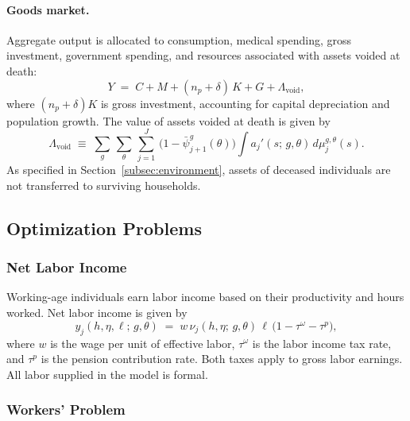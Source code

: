 \documentclass[12pt,a4paper]{article}
\begin{document}
\paragraph{Goods market.}
Aggregate output is allocated to consumption, medical spending, gross investment, government spending, and resources associated with assets voided at death:
\begin{equation}
\label{eq:goods_market}
Y \;=\; C + M + (n_p + \delta)\, K + G + \Lambda_{\mathrm{void}},
\end{equation}
where $(n_p+\delta)K$ is gross investment, accounting for capital depreciation and population growth. The value of assets voided at death is given by
\begin{equation}
\label{eq:leakage_voided}
\Lambda_{\mathrm{void}}
\;\equiv\;
\sum_g\, \sum_\theta\, \sum_{j=1}^{J}\, \bigl(1 - \bar\psi_{j+1}^{g}(\theta)\bigr)
\int a_j'(s;\, g, \theta)\, d\mu_{j}^{g,\theta}(s).
\end{equation}
As specified in Section~\ref{subsec:environment}, assets of deceased individuals are not transferred to surviving households.

\subsection{Optimization Problems}
\label{subsec:optimization}

\subsubsection{Net Labor Income}
\label{subsubsec:net_income}

Working-age individuals earn labor income based on their productivity and hours worked. Net labor income is given by
\begin{equation}
\label{eq:net_labor_income}
y_j(h, \eta, \ell;\, g, \theta) \;=\; w\, \nu_j(h, \eta;\, g, \theta)\, \ell\, \bigl(1 - \tau^\omega - \tau^p\bigr),
\end{equation}
where $w$ is the wage per unit of effective labor, $\tau^\omega$ is the labor income tax rate, and $\tau^p$ is the pension contribution rate. Both taxes apply to gross labor earnings. All labor supplied in the model is formal.


\subsubsection{Workers' Problem}
\label{subsubsec:worker}
\end{document}
